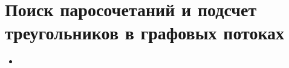 \section{Поиск паросочетаний и подсчет треугольников в графовых потоках} %
\label{sec:matching_and_triangles}

\begin{itemize}
	\item 
\end{itemize}

